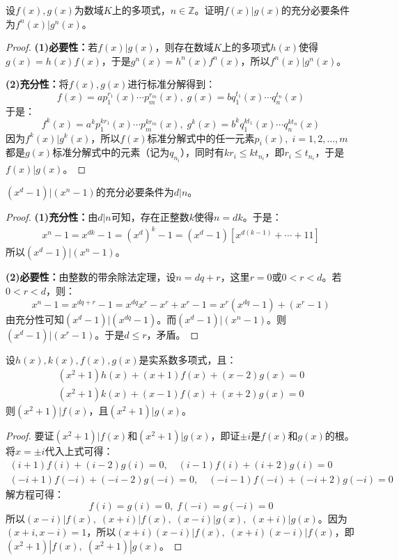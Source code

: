 \begin{theorem}
	设$f(x),g(x)$为数域$K$上的多项式，$n\in\mathbb{Z}$。证明$f(x)|g(x)$的充分必要条件为$f^n(x)|g^n(x)$。
\end{theorem}
\begin{proof}
	\textbf{(1)必要性：}若$f(x)|g(x)$，则存在数域$K$上的多项式$h(x)$使得$g(x)=h(x)f(x)$，于是$g^n(x)=h^n(x)f^n(x)$，所以$f^n(x)|g^n(x)$。\par
	\textbf{(2)充分性：}将$f(x),g(x)$进行标准分解得到：
	\begin{equation*}
		f(x)=ap_1^{r_1}(x)\cdots p_m^{r_m}(x),\;
		g(x)=bq_1^{t_1}(x)\cdots q_n^{t_n}(x)
	\end{equation*}
	于是：
	\begin{equation*}
		f^k(x)=a^kp_1^{kr_1}(x)\cdots p_m^{kr_m}(x),\;
		g^k(x)=b^kq_1^{kt_1}(x)\cdots q_n^{kt_n}(x)
	\end{equation*}
	因为$f^k(x)|g^k(x)$，所以$f(x)$标准分解式中的任一元素$p_i(x),\;i=1,2,\dots,m$都是$g(x)$标准分解式中的元素（记为$q_{n_i}$），同时有$kr_i\leqslant kt_{n_i}$，即$r_i\leqslant t_{n_i}$，于是$f(x)|g(x)$。
\end{proof}
\begin{theorem}
	$(x^d-1)|(x^n-1)$的充分必要条件为$d|n$。
\end{theorem}
\begin{proof}
	\textbf{(1)充分性：}由$d|n$可知，存在正整数$k$使得$n=dk$。于是：
	\begin{align*}
		x^n-1=x^{dk}-1=\left(x^d\right)^k-1=(x^d-1)[x^{d(k-1)}+\cdots+11]
	\end{align*}
	所以$(x^d-1)|(x^n-1)$。\par
	\textbf{(2)必要性：}由整数的带余除法定理，设$n=dq+r$，这里$r=0$或$0<r<d$。若$0<r<d$，则：
	\begin{equation*}
		x^n-1=x^{dq+r}-1=x^{dq}x^r-x^r+x^r-1=x^r(x^{dq}-1)+(x^r-1)
	\end{equation*}
	由充分性可知$(x^d-1)|(x^{dq}-1)$。而$(x^d-1)|(x^n-1)$。则$(x^d-1)|(x^r-1)$。于是$d\leqslant r$，矛盾。
\end{proof}
\begin{theorem}
	设$h(x),k(x),f(x),g(x)$是实系数多项式，且：
	\begin{gather*}
		(x^2+1)h(x)+(x+1)f(x)+(x-2)g(x)=0 \\
		(x^2+1)k(x)+(x-1)f(x)+(x+2)g(x)=0
	\end{gather*}
	则$(x^2+1)|f(x)$，且$(x^2+1)|g(x)$。
\end{theorem}
\begin{proof}
	要证$(x^2+1)|f(x)$和$(x^2+1)|g(x)$，即证$\pm i$是$f(x)$和$g(x)$的根。将$x=\pm i$代入上式可得：
	\begin{gather*}
		(i+1)f(i)+(i-2)g(i)=0,\quad(i-1)f(i)+(i+2)g(i)=0 \\
		(-i+1)f(-i)+(-i-2)g(-i)=0,\quad(-i-1)f(-i)+(-i+2)g(-i)=0
	\end{gather*}
	解方程可得：
	\begin{equation*}
		f(i)=g(i)=0,\;f(-i)=g(-i)=0
	\end{equation*}
	所以$(x-i)|f(x),\;(x+i)|f(x),\;(x-i)|g(x),\;(x+i)|g(x)$。因为$(x+i,x-i)=1$，所以$(x+i)(x-i)|f(x),\;(x+i)(x-i)|f(x)$，即$(x^2+1)|f(x),\;(x^2+1)|g(x)$。
\end{proof}
